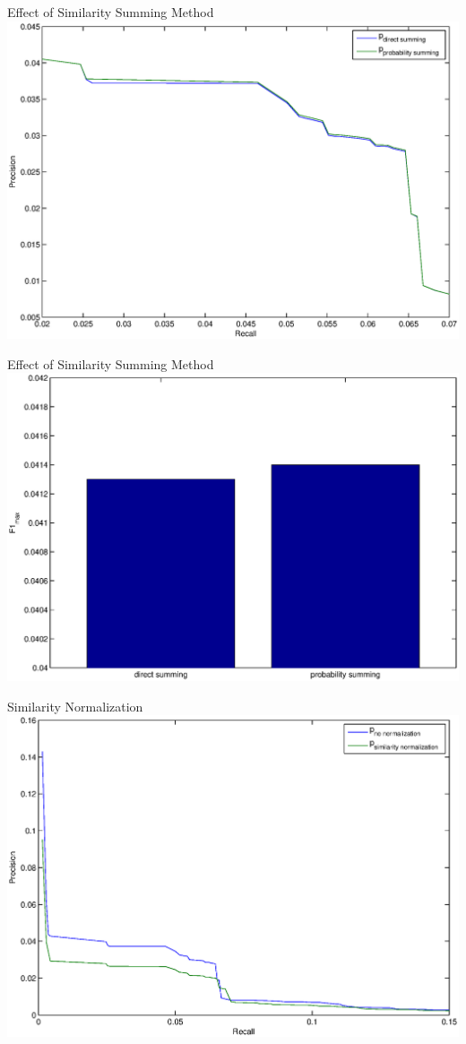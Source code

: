 \documentclass{beamer}
\begin{document}
\begin{frame}{Effect of Similarity Summing Method}
\includegraphics[width=\linewidth]{./summing_compare.eps}
\end{frame}

\begin{frame}{Effect of Similarity Summing Method}
\includegraphics[width=\linewidth]{./summing_compare_f1.eps}
\end{frame}


\begin{frame}{Similarity Normalization}
\includegraphics[width=\linewidth]{./sim_norm.eps}
\end{frame}
\end{document}
